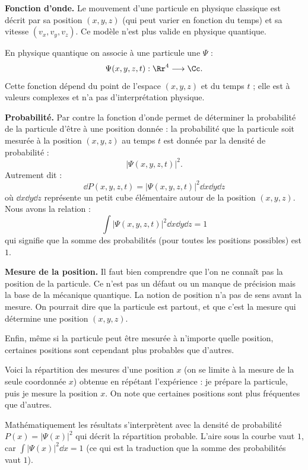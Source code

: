 \documentclass[11pt,class=report,crop=false]{standalone}
\begin{document}
\textbf{Fonction d'onde.}
Le mouvement d'une particule en physique classique est décrit par sa position $(x,y,z)$ (qui peut varier en fonction du temps) et sa vitesse $(v_x,v_y,v_z)$. Ce modèle n'est plus valide en physique quantique.

En physique quantique on associe à une particule une  $\Psi$ :
$$\Psi(x,y,z,t) : \Rr^4 \longrightarrow \Cc.$$
Cette fonction dépend du point de l'espace $(x,y,z)$ et du temps $t$ ; elle est à valeurs complexes et n'a pas d'interprétation physique.

\bigskip

\textbf{Probabilité.}
Par contre la fonction d'onde permet de déterminer la probabilité de la particule d'être à une position donnée : la probabilité que la particule soit mesurée à la position $(x,y,z)$ au temps $t$ est donnée par la densité de probabilité :
$$\left| \Psi(x,y,z,t) \right|^2.$$
Autrement dit :
$$\dd P(x,y,z,t) = \left| \Psi(x,y,z,t) \right|^2 \dd x \dd y \dd z$$
où $\dd x \dd y \dd z$ représente un petit cube élémentaire autour de la position $(x,y,z)$.
Nous avons la relation :
$$\int \left| \Psi(x,y,z,t) \right|^2 \dd x \dd y \dd z = 1$$
qui signifie que la somme des probabilités (pour toutes les positions possibles) est $1$.

\bigskip

\textbf{Mesure de la position.}
Il faut bien comprendre que l'on ne connaît pas la position de la particule. Ce n'est pas un défaut ou un manque de précision mais la base de la mécanique quantique. 
La notion de position n'a pas de sens avant la mesure. On pourrait dire que la particule est \og{}partout\fg{}, et que c'est la mesure qui détermine une position $(x,y,z)$. 

Enfin, même si la particule peut être mesurée à n'importe quelle position, certaines positions sont cependant plus probables que d'autres.

Voici la répartition des mesures d'une position $x$ (on se limite à la mesure de la seule coordonnée $x$) obtenue en répétant l'expérience : je prépare la particule, puis je mesure la position $x$. On note que certaines positions sont plus fréquentes que d'autres.


Mathématiquement les résultats s'interprètent avec la densité de probabilité $P(x) = \left| \Psi(x) \right|^2$ qui décrit la répartition probable. L'aire sous la courbe vaut $1$, car $\int \left| \Psi(x) \right|^2 \dd x = 1$ (ce qui est la traduction que la somme des probabilités vaut $1$).
\end{document}
